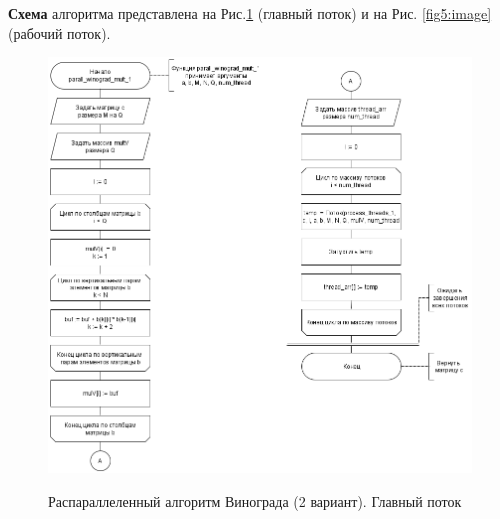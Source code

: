 \textbf{Схема} алгоритма представлена на Рис.\ref{fig4:image} (главный поток) и на Рис. \ref{fig5:image} (рабочий поток).\\
\begin{figure}[h]
	\begin{center}
		{\includegraphics[scale = 0.58]{schemes/parall_1_main}}
		\caption{Распараллеленный алгоритм Винограда (2 вариант). Главный поток}
		\label{fig4:image}
	\end{center}
\end{figure}

